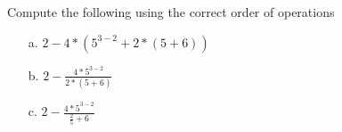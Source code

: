 {Compute the following using the correct order of operations

\begin{enumerate}
	\item[a.] $2 - 4*(5^{3-2} + 2*(5+6))$
	\item[b.] $2 - \displaystyle \frac{4*5^{3-2}}{2*(5+6)}$
	\item[c.] $2 - \displaystyle \frac{4*5^{3-2}}{\frac{2}{5}+6}$
\end{enumerate}}
{}